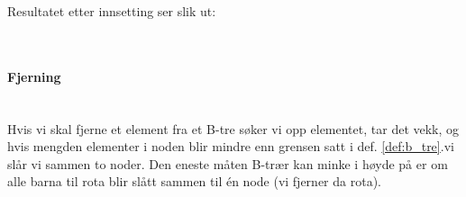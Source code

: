 \begin{example}
Resultatet etter innsetting ser slik ut:

\begin{figure}[H]
\centering
{}
\end{figure}
\end{example}

~\\
\paragraph{Fjerning}~\\
Hvis vi skal fjerne et element fra et B-tre søker vi opp elementet, tar det vekk, og hvis mengden elementer i noden blir mindre enn grensen satt i def. \ref{def:b_tre}.vi slår vi sammen to noder. Den eneste måten B-trær kan minke i høyde på er om alle barna til rota blir slått sammen til én node (vi fjerner da rota). 

